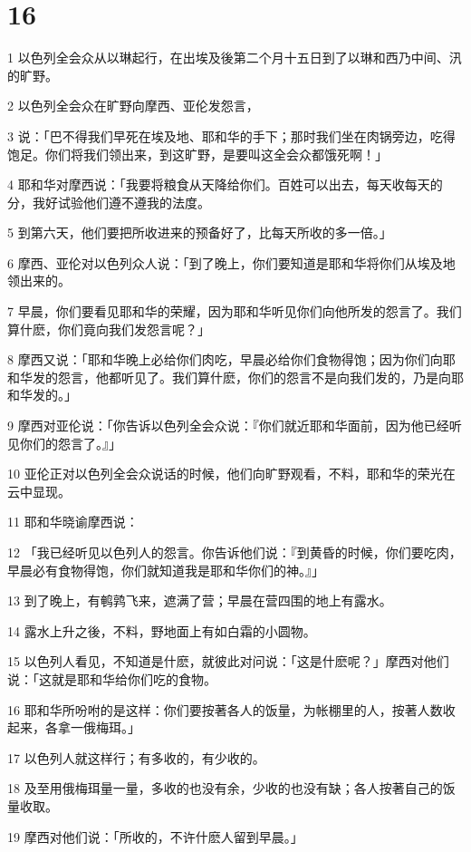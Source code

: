 \chapter{16}

\par 1 以色列全会众从以琳起行，在出埃及後第二个月十五日到了以琳和西乃中间、汛的旷野。
\par 2 以色列全会众在旷野向摩西、亚伦发怨言，
\par 3 说：「巴不得我们早死在埃及地、耶和华的手下；那时我们坐在肉锅旁边，吃得饱足。你们将我们领出来，到这旷野，是要叫这全会众都饿死啊！」
\par 4 耶和华对摩西说：「我要将粮食从天降给你们。百姓可以出去，每天收每天的分，我好试验他们遵不遵我的法度。
\par 5 到第六天，他们要把所收进来的预备好了，比每天所收的多一倍。」
\par 6 摩西、亚伦对以色列众人说：「到了晚上，你们要知道是耶和华将你们从埃及地领出来的。
\par 7 早晨，你们要看见耶和华的荣耀，因为耶和华听见你们向他所发的怨言了。我们算什麽，你们竟向我们发怨言呢？」
\par 8 摩西又说：「耶和华晚上必给你们肉吃，早晨必给你们食物得饱；因为你们向耶和华发的怨言，他都听见了。我们算什麽，你们的怨言不是向我们发的，乃是向耶和华发的。」
\par 9 摩西对亚伦说：「你告诉以色列全会众说：『你们就近耶和华面前，因为他已经听见你们的怨言了。』」
\par 10 亚伦正对以色列全会众说话的时候，他们向旷野观看，不料，耶和华的荣光在云中显现。
\par 11 耶和华晓谕摩西说：
\par 12 「我已经听见以色列人的怨言。你告诉他们说：『到黄昏的时候，你们要吃肉，早晨必有食物得饱，你们就知道我是耶和华你们的神。』」
\par 13 到了晚上，有鹌鹑飞来，遮满了营；早晨在营四围的地上有露水。
\par 14 露水上升之後，不料，野地面上有如白霜的小圆物。
\par 15 以色列人看见，不知道是什麽，就彼此对问说：「这是什麽呢？」摩西对他们说：「这就是耶和华给你们吃的食物。
\par 16 耶和华所吩咐的是这样：你们要按著各人的饭量，为帐棚里的人，按著人数收起来，各拿一俄梅珥。」
\par 17 以色列人就这样行；有多收的，有少收的。
\par 18 及至用俄梅珥量一量，多收的也没有余，少收的也没有缺；各人按著自己的饭量收取。
\par 19 摩西对他们说：「所收的，不许什麽人留到早晨。」
